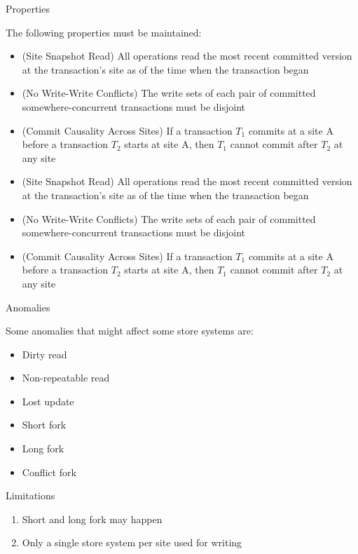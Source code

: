 \documentclass{beamer}
\begin{document}
		\begin{frame}{Properties}
		
		The following properties must be maintained:		
		\begin{itemize}
		\item (Site Snapshot Read) All operations read the most recent committed version at the transaction's site as of the time when the transaction began
		\item (No Write-Write Conflicts) The write sets of each pair of committed somewhere-concurrent transactions must be disjoint
		\item (Commit Causality Across Sites) If a transaction $T_{1}$ commits at a site A before a transaction $T_{2}$ starts at site A, then $T_{1}$ cannot commit after $T_{2}$ at any site
		\end{itemize}		
		
		\begin{itemize}
		\item (Site Snapshot Read) All operations read the most recent committed version at the transaction's site as of the time when the transaction began
		\item (No Write-Write Conflicts) The write sets of each pair of committed somewhere-concurrent transactions must be disjoint
		\item (Commit Causality Across Sites) If a transaction $T_{1}$ commits at a site A before a transaction $T_{2}$ starts at site A, then $T_{1}$ cannot commit after $T_{2}$ at any site
		\end{itemize}
		
		\end{frame}	

		\begin{frame}{Anomalies}
		
		Some anomalies that might affect some store systems are:
		\begin{itemize}
		\item Dirty read
		\item Non-repeatable read
		\item Lost update
		\item Short fork
		\item Long fork
		\item Conflict fork
		\end{itemize}		
		
		\end{frame}
		
		\begin{frame}{Limitations}

			\begin{enumerate}
			\item Short and long fork may happen
			\item Only a single store system per site used for writing
			\end{enumerate}
			
		\end{frame}
\end{document}
